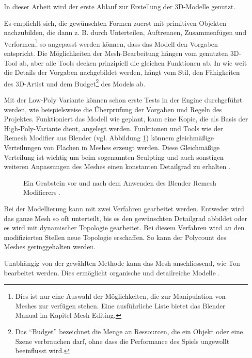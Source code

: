 \par
In dieser Arbeit wird der erste Ablauf zur Erstellung der 3D-Modelle genutzt.
\par
Es empfiehlt sich, die gewünschten Formen zuerst mit primitiven Objekten nachzubilden, die dann z. B. durch Unterteilen, Auftrennen, Zusammenfügen und Verformen\footnote{Dies ist nur eine Auswahl der Möglichkeiten, die zur Manipulation von Meshes zur verfügen stehen. Eine ausführliche Liste bietet das Blender Manual \parencite{blendermanual} im Kapitel Mesh Editing.} so angepasst werden können, dass das Modell den Vorgaben entspricht. Die Möglichkeiten der Mesh-Bearbeitung hängen vom genutzten 3D-Tool ab, aber alle Tools decken prinzipiell die gleichen Funktionen ab.
\newpage
In wie weit die Details der Vorgaben nachgebildet werden, hängt vom Stil, den Fähigkeiten des 3D-Artist und dem Budget\footnote{Das \enquote{Budget} bezeichnet die Menge an Ressourcen, die ein Objekt oder eine Szene verbrauchen darf, ohne dass die Performance des Spiels ungewollt beeinflusst wird.} des Models ab.
\par
Mit der Low-Poly Variante können schon erste Tests in der Engine durchgeführt werden, wie beispielsweise die Überprüfung der Vorgaben und Regeln des Projektes. Funktioniert das Modell wie geplant, kann eine Kopie, die als Basis der High-Poly-Variante dient, angelegt werden. Funktionen und Tools wie der Remesh Modifier aus Blender (vgl. Abbildung \ref{remesh}) könnem gleichmäßige Verteilungen von Flächen in Meshes erzeugt werden. Diese Gleichmäßige Verteilung ist wichtig um beim sogenannten Sculpting und auch sonstigen weiteren Anpassungen des Meshes einen konstanten Detailgrad zu erhalten \parencite{Grabstein}.
\begin{figure}[H]
\centering
  \caption{Ein Grabstein vor und nach dem Anwenden des Blender Remesh Modifierers \parencite{Grabstein}.}
\label{remesh}
\end{figure}
Bei der Modellierung kann mit zwei Verfahren gearbeitet werden. Entweder wird das ganze Mesh so oft unterteilt, bis es den gewünschten Detailgrad abbildet oder es wird mit dynamischer Topologie gearbeitet. Bei diesem Verfahren wird an den modifizierten Stellen neue Topologie erschaffen. So kann der Polycount des Meshes geringgehalten werden.
\par
Unabhängig von der gewählten Methode kann das Mesh anschliessend, wie Ton bearbeitet werden. Dies ermöglicht organische und detailreiche Modelle \parencite[S.\,172-189]{blender}.
